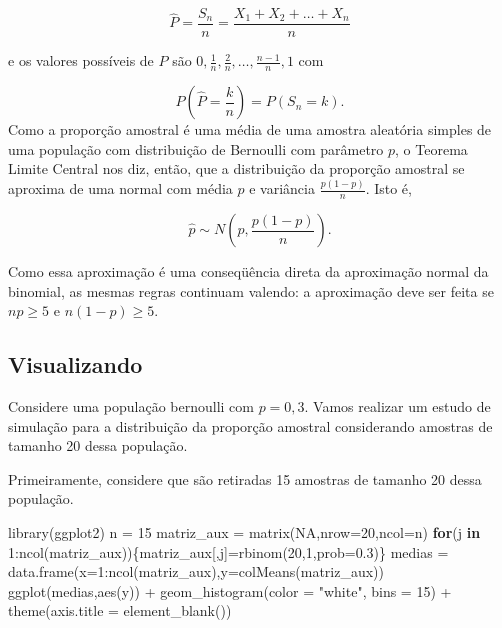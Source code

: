 \documentclass[
]{book}
\newenvironment{Shaded}{\begin{snugshade}}{\end{snugshade}}
\newcommand{\AttributeTok}[1]{\textcolor[rgb]{0.77,0.63,0.00}{#1}}
\newcommand{\ConstantTok}[1]{\textcolor[rgb]{0.00,0.00,0.00}{#1}}
\newcommand{\ControlFlowTok}[1]{\textcolor[rgb]{0.13,0.29,0.53}{\textbf{#1}}}
\newcommand{\DecValTok}[1]{\textcolor[rgb]{0.00,0.00,0.81}{#1}}
\newcommand{\FloatTok}[1]{\textcolor[rgb]{0.00,0.00,0.81}{#1}}
\newcommand{\FunctionTok}[1]{\textcolor[rgb]{0.00,0.00,0.00}{#1}}
\newcommand{\NormalTok}[1]{#1}
\newcommand{\OtherTok}[1]{\textcolor[rgb]{0.56,0.35,0.01}{#1}}
\newcommand{\SpecialCharTok}[1]{\textcolor[rgb]{0.00,0.00,0.00}{#1}}
\newcommand{\StringTok}[1]{\textcolor[rgb]{0.31,0.60,0.02}{#1}}
\begin{document}
\[\hat P = \frac{S_n}{n}=\frac{X_1+X_2+\ldots+X_n}{n}\]

e os valores possíveis de \(\hat P\) são \(0,\frac{1}{n},\frac{2}{n},\ldots,\frac{n-1}{n},1\) com

\[P\left(\hat P = \frac{k}{n}\right)=P(S_n=k).\]
Como a proporção amostral é uma média de uma amostra aleatória simples de uma população com distribuição de Bernoulli com parâmetro \(p\), o Teorema Limite Central nos diz, então, que a distribuição da proporção amostral se aproxima de uma normal com média \(p\) e variância \(\frac{p(1-p)}{n}\). Isto é,

\[\hat p \sim N\left(p,\frac{p(1-p)}{n}\right).\]

Como essa aproximação é uma conseqüência direta da aproximação normal da binomial, as mesmas regras continuam valendo: a aproximação deve ser feita se \(np \geq 5\) e \(n(1 - p) \geq 5\).

\hypertarget{visualizando-3}{%
\subsection{Visualizando}\label{visualizando-3}}

Considere uma população bernoulli com \(p=0,3\). Vamos realizar um estudo de simulação para a distribuição da proporção amostral considerando amostras de tamanho 20 dessa população.

Primeiramente, considere que são retiradas 15 amostras de tamanho 20 dessa população.

\begin{Shaded}
\begin{Highlighting}[]
\FunctionTok{library}\NormalTok{(ggplot2)}
\NormalTok{n }\OtherTok{=} \DecValTok{15}
\NormalTok{matriz\_aux }\OtherTok{=} \FunctionTok{matrix}\NormalTok{(}\ConstantTok{NA}\NormalTok{,}\AttributeTok{nrow=}\DecValTok{20}\NormalTok{,}\AttributeTok{ncol=}\NormalTok{n)}
\ControlFlowTok{for}\NormalTok{(j }\ControlFlowTok{in} \DecValTok{1}\SpecialCharTok{:}\FunctionTok{ncol}\NormalTok{(matriz\_aux))\{matriz\_aux[,j]}\OtherTok{=}\FunctionTok{rbinom}\NormalTok{(}\DecValTok{20}\NormalTok{,}\DecValTok{1}\NormalTok{,}\AttributeTok{prob=}\FloatTok{0.3}\NormalTok{)\}}
\NormalTok{medias }\OtherTok{=} \FunctionTok{data.frame}\NormalTok{(}\AttributeTok{x=}\DecValTok{1}\SpecialCharTok{:}\FunctionTok{ncol}\NormalTok{(matriz\_aux),}\AttributeTok{y=}\FunctionTok{colMeans}\NormalTok{(matriz\_aux))}
\FunctionTok{ggplot}\NormalTok{(medias,}\FunctionTok{aes}\NormalTok{(y)) }\SpecialCharTok{+}
  \FunctionTok{geom\_histogram}\NormalTok{(}\AttributeTok{color =} \StringTok{"white"}\NormalTok{, }\AttributeTok{bins =} \DecValTok{15}\NormalTok{) }\SpecialCharTok{+}
  \FunctionTok{theme}\NormalTok{(}\AttributeTok{axis.title =} \FunctionTok{element\_blank}\NormalTok{())}
\end{Highlighting}
\end{Shaded}
\end{document}
